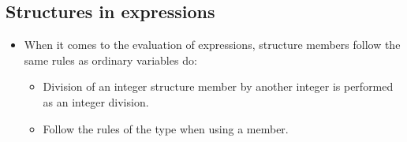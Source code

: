 \subsection{Structures in expressions}
\begin{itemize}
    \item When it comes to the evaluation of expressions, structure members follow the same rules as ordinary variables do:
        \begin{itemize}
            \item Division of an integer structure member by another integer is performed as an integer division. 
            
            \item Follow the rules of the type when using a member. 
        \end{itemize}    
\end{itemize}

